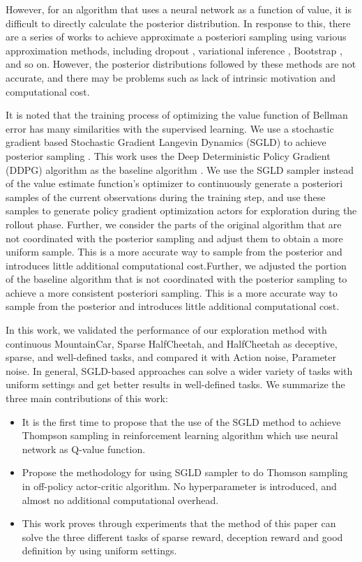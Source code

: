 However, for an algorithm that uses a neural network as a function of value, it is difficult to directly calculate the posterior distribution. In response to this, there are a series of works to achieve approximate a posteriori sampling using various approximation methods, including dropout \cite{dropoutInference}, variational inference \cite{VIME}, Bootstrap \cite{BDQN}, and so on. However, the posterior distributions followed by these methods are not accurate, and there may be problems such as lack of intrinsic motivation and computational cost. \cite{osband2018randomized}

It is noted that the training process of optimizing the value function of Bellman error has many similarities with the supervised learning. We use a stochastic gradient based Stochastic Gradient Langevin Dynamics (SGLD) to achieve posterior sampling \cite{SGLD}. This work uses the Deep Deterministic Policy Gradient (DDPG) algorithm as the baseline algorithm \cite{DDPG}. We use the SGLD sampler instead of the value estimate function's optimizer to continuously generate a posteriori samples of the current observations during the training step, and use these samples to generate policy gradient optimization actors for exploration during the rollout phase. Further, we consider the parts of the original algorithm that are not coordinated with the posterior sampling and adjust them to obtain a more uniform sample. This is a more accurate way to sample from the posterior and introduces little additional computational cost.Further, we adjusted the portion of the baseline algorithm that is not coordinated with the posterior sampling to achieve a more consistent posteriori sampling. This is a more accurate way to sample from the posterior and introduces little additional computational cost.

In this work, we validated the performance of our exploration method with continuous MountainCar, Sparse HalfCheetah, and HalfCheetah as deceptive, sparse, and well-defined tasks, and compared it with Action noise, Parameter noise. In general, SGLD-based approaches can solve a wider variety of tasks with uniform settings and get better results in well-defined tasks. We summarize the three main contributions of this work:
\begin{itemize}
\item  It is the first time to propose that the use of the SGLD method to achieve Thompson sampling in reinforcement learning algorithm which use neural network as Q-value function.
\item  Propose the methodology for using SGLD sampler to do Thomson sampling in off-policy actor-critic algorithm. No hyperparameter is introduced, and almost no additional computational overhead.
\item This work proves through experiments that the method of this paper can solve the three different tasks of sparse reward, deception reward and good definition by using uniform settings.
\end{itemize} 

